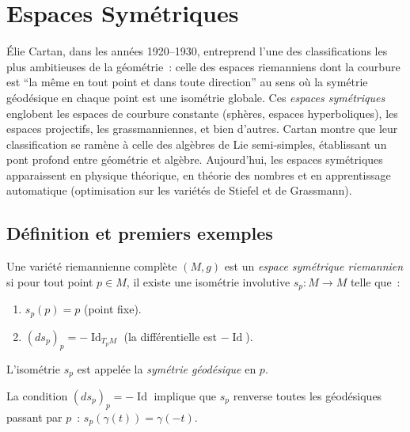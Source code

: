 \chapter{Espaces Sym\'etriques}
\label{ch:symetriques}

\'Elie Cartan, dans les ann\'ees 1920--1930, entreprend l'une des classifications les plus ambitieuses de la g\'eom\'etrie~: celle des espaces riemanniens dont la courbure est ``la m\^eme en tout point et dans toute direction'' au sens o\`u la sym\'etrie g\'eod\'esique en chaque point est une isom\'etrie globale. Ces \emph{espaces sym\'etriques} englobent les espaces de courbure constante (sph\`eres, espaces hyperboliques), les espaces projectifs, les grassmanniennes, et bien d'autres. Cartan montre que leur classification se ram\`ene \`a celle des alg\`ebres de Lie semi-simples, \'etablissant un pont profond entre g\'eom\'etrie et alg\`ebre. Aujourd'hui, les espaces sym\'etriques apparaissent en physique th\'eorique, en th\'eorie des nombres et en apprentissage automatique (optimisation sur les vari\'et\'es de Stiefel et de Grassmann).

\section{D\'efinition et premiers exemples}

\begin{definition}
Une vari\'et\'e riemannienne compl\`ete $(M, g)$ est un \emph{espace sym\'etrique
riemannien} si pour tout point $p \in M$, il existe une isom\'etrie involutive
$s_p : M \to M$ telle que~:
\begin{enumerate}
    \item $s_p(p) = p$ (point fixe).
    \item $(ds_p)_p = -\operatorname{Id}_{T_pM}$ (la diff\'erentielle est $-\operatorname{Id}$).
\end{enumerate}
L'isom\'etrie $s_p$ est appel\'ee la \emph{sym\'etrie g\'eod\'esique} en $p$.
\end{definition}

\begin{remarque}
La condition $(ds_p)_p = -\operatorname{Id}$ implique que $s_p$ renverse toutes
les g\'eod\'esiques passant par $p$~: $s_p(\gamma(t)) = \gamma(-t)$.
\end{remarque}

